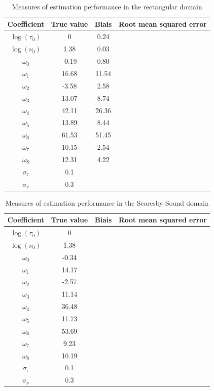 \documentclass[11pt]{article}
\newcommand {\1}{\mathbb{1}}
\begin{document}
\begin{table}[H]
		\centering
	\begin{tabular}{|c|c|c|c|}
		\hline
		Coefficient  & True value & Biais & Root mean squared error  \\
		\hline
		$\log(\tau_0)$  & 0& 0.24 &  \\
		\hline
		$\log(\nu_0)$  & 1.38 & 0.03 &  \\
		\hline
		$\omega_0$  &  -0.19  & 0.80 &  \\
		\hline
		$\omega_1$  & 16.68 & 11.54 &  \\
		\hline
		$\omega_2$  & -3.58 & 2.58 &  \\
		\hline
		$\omega_3$  & 13.07 &  8.74 &  \\
		\hline
		$\omega_4$  & 42.11 & 26.36 &  \\
		\hline
		$\omega_5$  & 13.89 & 8.44 &  \\
		\hline
		$\omega_6$  &  61.53 & 51.45 &  \\
		\hline
		$\omega_7$  & 10.15 & 2.54 &  \\
		\hline
		$\omega_8$  &  12.31 & 4.22 &  \\
		\hline
		$\sigma_{\tau}$ & 0.1 & & \\
		\hline
		$\sigma_{\nu}$ & 0.3 & & \\
		\hline
	\end{tabular}
	\caption{Measures of estimation performance in the rectangular domain}
	\label{table: estimation performance rect}
\end{table}

\begin{table}[H]
	\centering
	\begin{tabular}{|c|c|c|c|}
		\hline
		Coefficient  & True value & Biais & Root mean squared error  \\
		\hline
		$\log(\tau_0)$  &  0 &  &  \\
		\hline
		$\log(\nu_0)$  &  1.38 &  &  \\
		\hline
		$\omega_0$  & -0.34 &  &  \\
		\hline
		$\omega_1$  & 14.17  &  &  \\
		\hline
		$\omega_2$  & -2.57 &  &  \\
		\hline
		$\omega_3$  & 11.14 &  &  \\
		\hline
		$\omega_4$  & 36.48  &  &  \\
		\hline
		$\omega_5$  & 11.73 &  &  \\
		\hline
		$\omega_6$  & 53.69 &  &  \\
		\hline
		$\omega_7$  & 9.23 &  &  \\
		\hline
		$\omega_8$  & 10.19 &  &  \\
		\hline
		$\sigma_{\tau}$ & 0.1 & & \\
		\hline
		$\sigma_{\nu}$ & 0.3 & & \\
		\hline
	\end{tabular}
	\caption{Measures of estimation performance in the Scoresby Sound domain}
	\label{table: estimation performance fjords}
\end{table}
\end{document}
